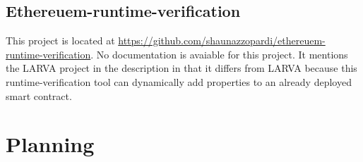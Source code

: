\documentclass[a4paper]{article}
\begin{document}
\subsection{Ethereuem-runtime-verification}
This project is located at \url{https://github.com/shaunazzopardi/ethereuem-runtime-verification}. No documentation is avaiable for this project. It mentions the LARVA project in the description in that it differs from LARVA because this runtime-verification tool can dynamically add properties to an already deployed smart contract.



\section{Planning}
\end{document}
